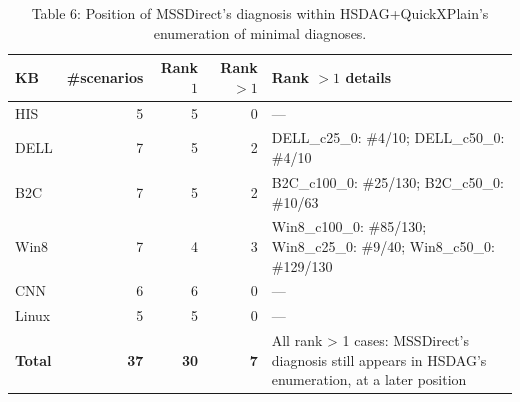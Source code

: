 \begin{table}[htbp]
\centering
\scriptsize
\begin{tabular}{lrrrl}
\toprule
KB & \#scenarios & Rank $1$ & Rank $>1$ & Rank $>1$ details \\
\midrule
HIS & 5 & 5 & 0 & — \\
DELL & 7 & 5 & 2 & DELL\_c25\_0: \#4/10; DELL\_c50\_0: \#4/10 \\
B2C & 7 & 5 & 2 & B2C\_c100\_0: \#25/130; B2C\_c50\_0: \#10/63 \\
Win8 & 7 & 4 & 3 & Win8\_c100\_0: \#85/130; Win8\_c25\_0: \#9/40; Win8\_c50\_0: \#129/130 \\
CNN & 6 & 6 & 0 & — \\
Linux & 5 & 5 & 0 & — \\
\midrule
\textbf{Total} & \textbf{37} & \textbf{30} & \textbf{7} & All rank > 1 cases: MSSDirect's diagnosis still appears in HSDAG's enumeration, at a later position \\
\bottomrule
\end{tabular}
\caption{Table 6: Position of MSSDirect's diagnosis within HSDAG+QuickXPlain's enumeration of minimal diagnoses.}
\label{tab:table6}
\end{table}
